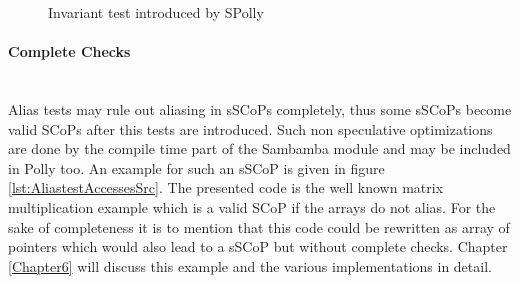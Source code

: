 \lstset{frame=none}
\begin{figure}[htbp]
  \centering
  \hspace*{5mm}
  \caption{Invariant test introduced by SPolly}
  \label{lst:InvariantTest}  
\end{figure}
\resetlst

\orange
\begin{shaded}
\paragraph{Complete Checks \\}
~\\
Alias tests may rule out aliasing in sSCoPs completely, thus some sSCoPs become
valid SCoPs after this tests are introduced. Such non speculative optimizations
are done by the compile time part of the Sambamba module and may be included in 
Polly too. An example for such an sSCoP is given in figure 
\ref{lst:AliastestAccessesSrc}. The presented code is the well known
matrix multiplication example which is a valid SCoP if the arrays do not alias.
For the sake of completeness it is to mention that this code could be
rewritten as array of pointers which would also lead to a sSCoP but without
complete checks. Chapter \ref{Chapter6} will discuss this example and the various
implementations in detail.


\end{shaded}


